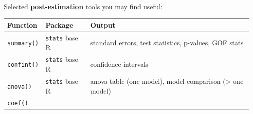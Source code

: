 \documentclass[
]{book}
\begin{document}
Selected \textbf{post-estimation} tools you may find useful:

\begin{longtable}[]{@{}lll@{}}
\toprule
\begin{minipage}[b]{0.16\columnwidth}\raggedright
Function\strut
\end{minipage} & \begin{minipage}[b]{0.17\columnwidth}\raggedright
Package\strut
\end{minipage} & \begin{minipage}[b]{0.59\columnwidth}\raggedright
Output\strut
\end{minipage}\tabularnewline
\midrule
\endhead
\begin{minipage}[t]{0.16\columnwidth}\raggedright
\texttt{summary()}\strut
\end{minipage} & \begin{minipage}[t]{0.17\columnwidth}\raggedright
\texttt{stats} base R\strut
\end{minipage} & \begin{minipage}[t]{0.59\columnwidth}\raggedright
standard errors, test statistics, p-values, GOF stats\strut
\end{minipage}\tabularnewline
\begin{minipage}[t]{0.16\columnwidth}\raggedright
\texttt{confint()}\strut
\end{minipage} & \begin{minipage}[t]{0.17\columnwidth}\raggedright
\texttt{stats} base R\strut
\end{minipage} & \begin{minipage}[t]{0.59\columnwidth}\raggedright
confidence intervals\strut
\end{minipage}\tabularnewline
\begin{minipage}[t]{0.16\columnwidth}\raggedright
\texttt{anova()}\strut
\end{minipage} & \begin{minipage}[t]{0.17\columnwidth}\raggedright
\texttt{stats} base R\strut
\end{minipage} & \begin{minipage}[t]{0.59\columnwidth}\raggedright
anova table (one model), model comparison (\textgreater{} one model)\strut
\end{minipage}\tabularnewline
\begin{minipage}[t]{0.16\columnwidth}\raggedright
\texttt{coef()}\strut
\end{minipage} & \begin{minipage}[t]{0.17\columnwidth}\raggedright

\end{minipage}
\end{longtable}
\end{document}
